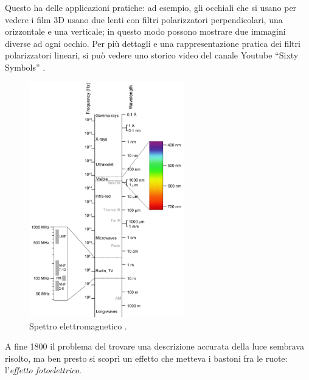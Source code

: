 \documentclass[a4paper,12pt]{article}
\begin{document}

Questo ha delle applicazioni pratiche: ad esempio, gli occhiali che si usano per vedere i film 3D usano due lenti con filtri polarizzatori perpendicolari, una orizzontale e una verticale; in questo modo possono mostrare due immagini diverse ad ogni occhio. Per più dettagli e una rappresentazione pratica dei filtri polarizzatori lineari, si può vedere uno storico video del canale Youtube ``Sixty Symbols'' \cite[]{How3DGlasses2012}.

\begin{figure}[ht]
\centering
\includegraphics[width=0.6\textwidth]{Electromagnetic-Spectrum.png}
\caption{Spettro elettromagnetico \cite[]{penubagEnglishElectromagneticSpectrum}.}
\label{fig:electromagnetic-spectrum}
\end{figure}

A fine 1800 il problema del trovare una descrizione accurata della luce sembrava risolto, ma ben presto si scoprì un effetto che metteva i bastoni fra le ruote: l'\emph{effetto fotoelettrico}.
\end{document}
